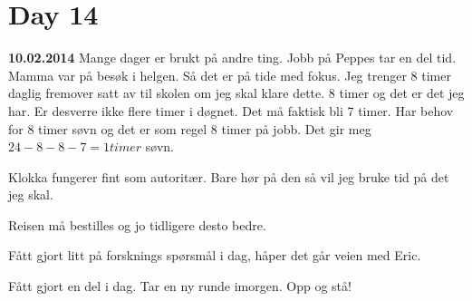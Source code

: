\section{Day 14}
\textbf{10.02.2014}
Mange dager er brukt på andre ting.
Jobb på Peppes tar en del tid. Mamma var på besøk i helgen.
Så det er på tide med fokus. Jeg trenger 8 timer daglig fremover satt av til skolen om jeg skal klare dette.
8 timer og det er det jeg har. Er desverre ikke flere timer i døgnet.
Det må faktisk bli 7 timer. Har behov for 8 timer søvn og det er som regel 8 timer på jobb.
Det gir meg \(24-8-8-7 = 1 timer \) søvn.

Klokka fungerer fint som autoritær. Bare hør på den så vil jeg bruke tid på det jeg skal. 

Reisen må bestilles og jo tidligere desto bedre.

Fått gjort litt på forsknings spørsmål i dag, håper det går veien med Eric.


Fått gjort en del i dag. Tar en ny runde imorgen. Opp og stå!